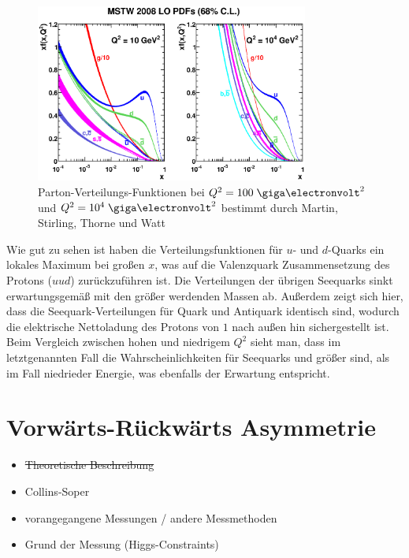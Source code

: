 \begin{figure}
    \centering
    \includegraphics[width=0.8\textwidth]{img/mstw}
    \caption[Parton-Verteilungs-Funktionen bei $Q^2=100\GeV^2$ und
        $Q^2=10^4\GeV^2$]
        {Parton-Verteilungs-Funktionen bei \mbox{$Q^2=100\GeV^2$} und 
        \mbox{$Q^2=10^4\GeV^2$} bestimmt durch Martin, Stirling, Thorne und
        Watt \cite{Martin:2009iq}}
    \label{fig:mstw}
\end{figure}

Wie gut zu sehen ist haben die Verteilungsfunktionen für $u$- und $d$-Quarks
ein lokales Maximum bei großen $x$, was auf die Valenzquark Zusammensetzung des
Protons ($uud$) zurückzuführen ist. Die Verteilungen der übrigen Seequarks
sinkt erwartungsgemäß mit den größer werdenden Massen ab.  Außerdem zeigt sich
hier, dass die Seequark-Verteilungen für Quark und Antiquark identisch sind,
wodurch die elektrische Nettoladung des Protons von $1$ nach außen hin
sichergestellt ist. Beim Vergleich zwischen hohen und niedrigem $Q^2$ sieht
man, dass im letztgenannten Fall die Wahrscheinlichkeiten für Seequarks und
größer sind, als im Fall niedrieder Energie, was ebenfalls der Erwartung
entspricht.




\section{Vorwärts-Rückwärts Asymmetrie}
\label{theory:afb}

\begin{itemize}
    \item \sout{Theoretische Beschreibung}
    \item Collins-Soper
    \item vorangegangene Messungen / andere Messmethoden
    \item Grund der Messung (Higgs-Constraints)
\end{itemize}

